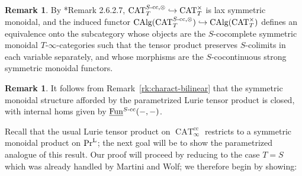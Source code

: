 \documentclass[reqno]{memo-l}
\theoremstyle{mythm}
\theoremstyle{definition}
\newtheorem{rk}[thm]{Remark}
\numberwithin{equation}{section}
\DeclareMathOperator{\CAT}{CAT}
\newcommand{\PrL}{\textup{Pr}^{\textup{L}}}
\newcommand{\Fun}{{\textup{Fun}}}
\DeclareMathOperator{\CAlg}{\textup{CAlg}}
\newcommand{\ulhelper}[2]{\underline{\setbox0=\hbox{$#1#2$}\dp0=0.4pt \box0\relax}}
\newcommand{\ul}[1]{{\mathpalette\ulhelper{#1}}\hbox{\rule[-2pt]{0pt}{0pt}}}
\begin{document}
\begin{rk}\label{rk:CAlg-for-param-Lurie}
    By \cite{martiniwolf2022presentable}*{Remark 2.6.2.7}, $\CAT_T^{\textup{$S$-cc},\otimes}\hookrightarrow\CAT_T^\times$ is lax symmetric monoidal, and the induced functor $\CAlg(\CAT_T^{\textup{$S$-cc},\otimes})\hookrightarrow\CAlg(\CAT_T^\times)$ defines an equivalence onto the subcategory whose objects are the $S$-cocomplete symmetric monoidal $T$-$\infty$-categories such that the tensor product preserves $S$-colimits in each variable separately, and whose morphisms are the $S$-cocontinuous strong symmetric monoidal functors.
\end{rk}

\begin{rk}\label{rk:S-cc-closed}
    It follows from Remark~\ref{rk:charact-bilinear} that the symmetric monoidal structure afforded by the parametrized Lurie tensor product is closed, with internal homs given by $\ul\Fun^\text{$S$-cc}(-,-)$.
\end{rk}

Recall that the usual Lurie tensor product on $\CAT_\infty^\text{cc}$ restricts to a symmetric monoidal product on $\PrL$; the next goal will be to show the parametrized analogue of this result. Our proof will proceed by reducing to the case $T=S$ which was already handled by Martini and Wolf; we therefore begin by showing:
\end{document}
